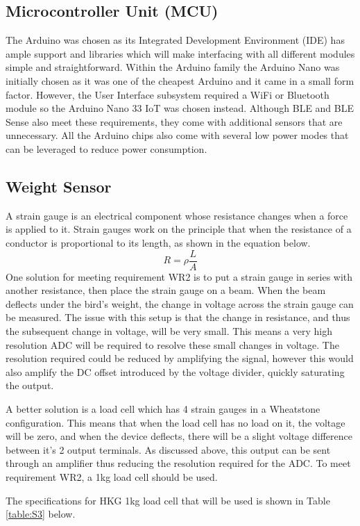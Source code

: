 \documentclass[class=report,11pt,crop=false]{standalone}
\begin{document}
	\subsection{Microcontroller Unit (MCU)}
	The Arduino was chosen as its Integrated Development Environment (IDE) has ample support and libraries which will make interfacing with all different modules simple and straightforward. Within the Arduino family the Arduino Nano was initially chosen as it was one of the cheapest Arduino and it came in a small form factor. However, the User Interface subsystem required a WiFi or Bluetooth module so the Arduino Nano 33 IoT was chosen instead. Although BLE and BLE Sense also meet these requirements, they come with additional sensors that are unnecessary. All the Arduino chips also come with several low power modes that can be leveraged to reduce power consumption.
	
	\subsection{Weight Sensor}
	A strain gauge is an electrical component whose resistance changes when a force is applied to it. Strain gauges work on the principle that when the resistance of a conductor is proportional to its length, as shown in the equation below. 
	\[R = \rho \frac{L}{A}\]
	One solution for meeting requirement WR2 is to put a strain gauge in series with another resistance, then place the strain gauge on a beam. When the beam deflects under the bird’s weight, the change in voltage across the strain gauge can be measured. The issue with this setup is that the change in resistance, and thus the subsequent change in voltage, will be very small. This means a very high resolution ADC will be required to resolve these small changes in voltage. The resolution required could be reduced by amplifying the signal, however this would also amplify the DC offset introduced by the voltage divider, quickly saturating the output.
	
	A better solution is a load cell which has 4 strain gauges in a Wheatstone configuration. This means that when the load cell has no load on it, the voltage will be zero, and when the device deflects, there will be a slight voltage difference between it’s 2 output terminals. As discussed above, this output can be sent through an amplifier thus reducing the resolution required for the ADC. To meet requirement WR2, a 1kg load cell should be used. 
	
	The specifications for HKG 1kg load cell that will be used is shown in Table \ref{table:S3} below.
\end{document}
